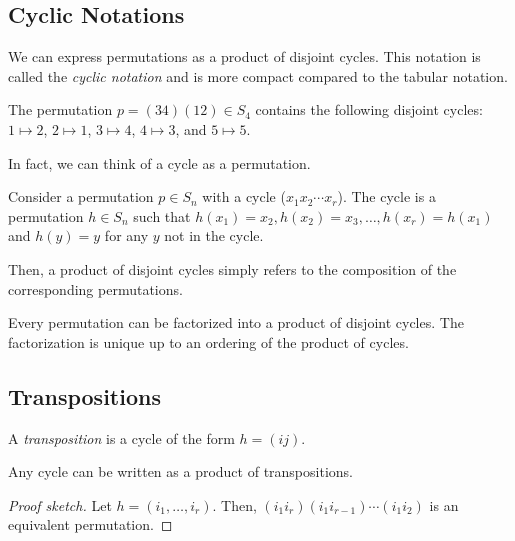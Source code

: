 \documentclass{article}
\begin{document}
\subsection{Cyclic Notations}

We can express permutations as a product of disjoint cycles. This notation is called the \emph{cyclic notation} and is more compact compared to the tabular notation.

\begin{example}
  The permutation $p = (34)(12) \in S_4$ contains the following disjoint cycles: $1 \mapsto 2$, $2 \mapsto 1$, $3 \mapsto 4$, $4 \mapsto 3$, and $5 \mapsto 5$.
\end{example}

In fact, we can think of a cycle as a permutation.

\begin{definition}
  Consider a permutation $p \in S_n$ with a cycle ($x_1 x_2 \cdots x_r$). The cycle is a permutation $h \in S_n$ such that $h(x_1) = x_2, h(x_2) = x_3, \ldots, h(x_r) = h(x_1)$ and $h(y) = y$ for any $y$ not in the cycle.
\end{definition}

Then, a product of disjoint cycles simply refers to the composition of the corresponding permutations.

\begin{proposition}
  Every permutation can be factorized into a product of disjoint cycles. The factorization is unique up to an ordering of the product of cycles.
\end{proposition}

\subsection{Transpositions}

\begin{definition}
  A \emph{transposition} is a cycle of the form $h = (ij)$.
\end{definition}

\begin{proposition}
  Any cycle can be written as a product of transpositions.
\end{proposition}

\begin{proof}[Proof sketch]
  Let $h = (i_1, \ldots, i_r)$. Then, $(i_1 i_r)(i_1 i_{r-1})\cdots(i_1 i_2)$ is an equivalent permutation.
\end{proof}
\end{document}
